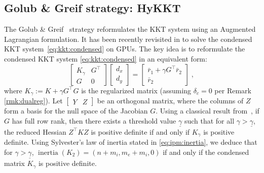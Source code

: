 \documentclass[smallextended]{svjour3}
\DeclareMathOperator{\inertia}{inertia}
\begin{document}
\subsection{Golub \& Greif strategy: HyKKT}
\label{sec:kkt:golubgreif}
The Golub \& Greif~\cite{golub2003solving} strategy reformulates the KKT
system using an Augmented Lagrangian formulation.
It has been recently revisited in \cite{regev2023hykkt} to solve the
condensed KKT system~\eqref{eq:kkt:condensed} on GPUs.
The key idea is to reformulate the condensed KKT system \eqref{eq:kkt:condensed} in an equivalent form:
\begin{equation}
  \label{eq:kkt:hykkt}
  \begin{bmatrix}
    K_\gamma & G^\top \\
    G & 0
  \end{bmatrix}
  \begin{bmatrix}
    d_x \\ d_y
  \end{bmatrix}
  =
  \begin{bmatrix}
    \bar{r}_1 + \gamma G^\top \bar{r}_2 \\
    \bar{r}_2
  \end{bmatrix} \; ,
\end{equation}
where $K_\gamma := K + \gamma G^\top G$ is the regularized matrix (assuming $\delta_c=0$ per Remark \ref{rmk:dualreg}).
Let $\begin{bmatrix} Y & Z \end{bmatrix}$ be an orthogonal
matrix, where the columns of $Z$ form a basis for the null space of the Jacobian $G$.
Using a classical result from~\cite{debreu1952definite}, if $G$ has full row
rank, then there exists a threshold value $\underline{\gamma}$ such that for
all $\gamma > \underline{\gamma}$, the reduced Hessian $Z^\top K Z$ is
positive definite if and only if $K_\gamma$ is positive definite.
Using Sylvester's law of inertia stated in \eqref{eq:ipm:inertia}, we deduce that for $\gamma > \underline{\gamma}$, $\inertia(K_2) = (n + m_i, m_e + m_i, 0)$ if and only if the condensed matrix $K_\gamma$ is positive definite.
\end{document}
